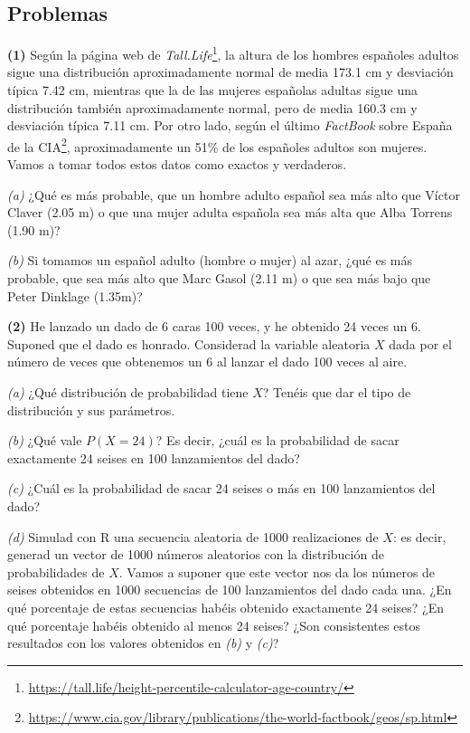\documentclass[
]{book}
\DeclareRobustCommand{\href}[2]{#2\footnote{\url{#1}}}
\theoremstyle{definition}
\theoremstyle{definition}
\theoremstyle{definition}
\theoremstyle{remark}
\begin{document}
\hypertarget{problemas}{%
\subsection*{Problemas}\label{problemas}}

\textbf{(1)} Según \href{https://tall.life/height-percentile-calculator-age-country/}{la página web de \emph{Tall.Life}}, la altura de los hombres españoles adultos sigue una distribución aproximadamente normal de media 173.1 cm y desviación típica 7.42 cm, mientras que la de las mujeres españolas adultas sigue una distribución también aproximadamente normal, pero de media 160.3 cm y desviación típica 7.11 cm.
Por otro lado, según \href{https://www.cia.gov/library/publications/the-world-factbook/geos/sp.html}{el último \emph{FactBook} sobre España de la CIA}, aproximadamente un 51\% de los españoles adultos son mujeres. Vamos a tomar todos estos datos como exactos y verdaderos.

\emph{(a)} ¿Qué es más probable, que un hombre adulto español sea más alto que Víctor Claver (2.05 m) o que una mujer adulta española sea más alta que Alba Torrens (1.90 m)?

\emph{(b)} Si tomamos un español adulto (hombre o mujer) al azar, ¿qué es más probable, que sea más alto que Marc Gasol (2.11 m) o que sea más bajo que Peter Dinklage (1.35m)?

\textbf{(2)} He lanzado un dado de 6 caras 100 veces, y he obtenido 24 veces un 6. Suponed que el dado es honrado. Considerad la variable aleatoria \(X\) dada por el número de veces que obtenemos un 6 al lanzar el dado 100 veces al aire.

\emph{(a)} ¿Qué distribución de probabilidad tiene \(X\)? Tenéis que dar el tipo de distribución y sus parámetros.

\emph{(b)} ¿Qué vale \(P(X=24)\)? Es decir, ¿cuál es la probabilidad de sacar exactamente 24 seises en 100 lanzamientos del dado?

\emph{(c)} ¿Cuál es la probabilidad de sacar 24 seises o más en 100 lanzamientos del dado?

\emph{(d)} Simulad con R una secuencia aleatoria de 1000 realizaciones de \(X\): es decir, generad un vector de 1000 números aleatorios con la distribución de probabilidades de \(X\). Vamos a suponer que este vector nos da los números de seises obtenidos en 1000 secuencias de 100 lanzamientos del dado cada una. ¿En qué porcentaje de estas secuencias habéis obtenido exactamente 24 seises? ¿En qué porcentaje habéis obtenido al menos 24 seises? ¿Son consistentes estos resultados con los valores obtenidos en \emph{(b)} y \emph{(c)}?
\end{document}

